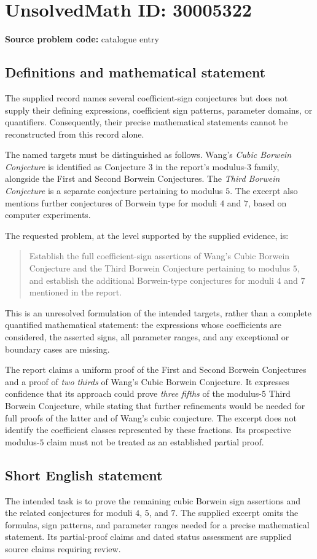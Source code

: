 \documentclass[11pt]{article}
\begin{document}
\section*{UnsolvedMath ID: 30005322}
\textbf{Source problem code:} catalogue entry
\subsection{Definitions and mathematical statement}
The supplied record names several coefficient-sign conjectures but does not supply their defining expressions, coefficient sign patterns, parameter domains, or quantifiers. Consequently, their precise mathematical statements cannot be reconstructed from this record alone.

The named targets must be distinguished as follows. Wang's \emph{Cubic Borwein Conjecture} is identified as Conjecture 3 in the report's modulus-\(3\) family, alongside the First and Second Borwein Conjectures. The \emph{Third Borwein Conjecture} is a separate conjecture pertaining to modulus \(5\). The excerpt also mentions further conjectures of Borwein type for moduli \(4\) and \(7\), based on computer experiments.

The requested problem, at the level supported by the supplied evidence, is:
\begin{quote}
Establish the full coefficient-sign assertions of Wang's Cubic Borwein Conjecture and the Third Borwein Conjecture pertaining to modulus \(5\), and establish the additional Borwein-type conjectures for moduli \(4\) and \(7\) mentioned in the report.
\end{quote}
This is an unresolved formulation of the intended targets, rather than a complete quantified mathematical statement: the expressions whose coefficients are considered, the asserted signs, all parameter ranges, and any exceptional or boundary cases are missing.

The report claims a uniform proof of the First and Second Borwein Conjectures and a proof of \emph{two thirds} of Wang's Cubic Borwein Conjecture. It expresses confidence that its approach could prove \emph{three fifths} of the modulus-\(5\) Third Borwein Conjecture, while stating that further refinements would be needed for full proofs of the latter and of Wang's cubic conjecture. The excerpt does not identify the coefficient classes represented by these fractions. Its prospective modulus-\(5\) claim must not be treated as an established partial proof.
\subsection{Short English statement}
The intended task is to prove the remaining cubic Borwein sign assertions and the related conjectures for moduli \(4\), \(5\), and \(7\). The supplied excerpt omits the formulas, sign patterns, and parameter ranges needed for a precise mathematical statement. Its partial-proof claims and dated status assessment are supplied source claims requiring review.
\end{document}
